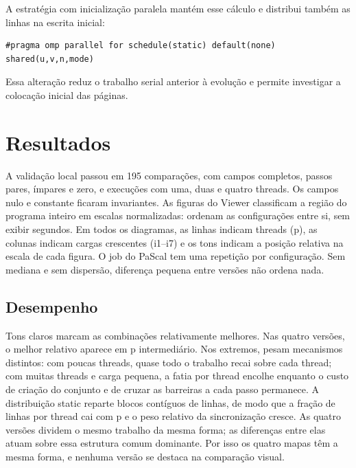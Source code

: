 \documentclass[11pt,letterpaper]{article}
\begin{document}
A estratégia com inicialização paralela mantém esse cálculo e distribui também as linhas na escrita inicial:
\begin{lstlisting}[caption={Distribuição da inicialização dos dois campos.}]
#pragma omp parallel for schedule(static) default(none) shared(u,v,n,mode)
\end{lstlisting}
Essa alteração reduz o trabalho serial anterior à evolução e permite investigar a colocação inicial das páginas.

\section{Resultados}
A validação local passou em 195 comparações, com campos completos, passos pares, ímpares e zero, e execuções com uma, duas e quatro threads. Os campos nulo e constante ficaram invariantes. As figuras do Viewer classificam a região do programa inteiro em escalas normalizadas: ordenam as configurações entre si, sem exibir segundos. Em todos os diagramas, as linhas indicam threads (p), as colunas indicam cargas crescentes (i1--i7) e os tons indicam a posição relativa na escala de cada figura. O job do PaScal tem uma repetição por configuração. Sem mediana e sem dispersão, diferença pequena entre versões não ordena nada.

\newpage
\subsection{Desempenho}
Tons claros marcam as combinações relativamente melhores. Nas quatro versões, o melhor relativo aparece em p intermediário. Nos extremos, pesam mecanismos distintos: com poucas threads, quase todo o trabalho recai sobre cada thread; com muitas threads e carga pequena, a fatia por thread encolhe enquanto o custo de criação do conjunto e de cruzar as barreiras a cada passo permanece. A distribuição static reparte blocos contíguos de linhas, de modo que a fração de linhas por thread cai com p e o peso relativo da sincronização cresce. As quatro versões dividem o mesmo trabalho da mesma forma; as diferenças entre elas atuam sobre essa estrutura comum dominante. Por isso os quatro mapas têm a mesma forma, e nenhuma versão se destaca na comparação visual.
\end{document}
